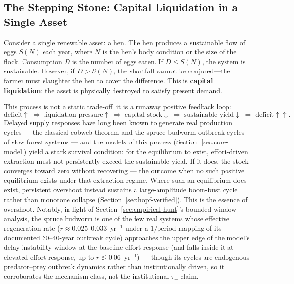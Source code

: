 \documentclass[twocolumn,10pt]{article}
\begin{document}
\subsection{The Stepping Stone: Capital Liquidation in a Single Asset}
Consider a single renewable asset: a hen. The hen produces a sustainable flow of eggs \(S(N)\) each year, where \(N\) is the hen's body condition or the size of the flock. Consumption \(D\) is the number of eggs eaten. If \(D \leq S(N)\), the system is sustainable. However, if \(D > S(N)\), the shortfall cannot be conjured---the farmer must slaughter the hen to cover the difference. This is \textbf{capital liquidation}: the asset is physically destroyed to satisfy present demand.

This process is not a static trade-off; it is a runaway positive feedback loop:
\[
\text{deficit} \uparrow \;\Rightarrow\; \text{liquidation pressure} \uparrow \;\Rightarrow\; \text{capital stock} \downarrow \;\Rightarrow\; \text{sustainable yield} \downarrow \;\Rightarrow\; \text{deficit} \uparrow\uparrow .
\]
Delayed supply responses have long been known to generate real production cycles --- the classical cobweb theorem \cite{ezekiel1938} and the spruce-budworm outbreak cycles of slow forest systems \cite{ludwig1978} --- and the models of this process (Section~\ref{sec:core-model}) yield a stark survival condition: for the equilibrium to exist, effort-driven extraction must not persistently exceed the sustainable yield. If it does, the stock converges toward zero without recovering --- the outcome when no such positive equilibrium exists under that extraction regime. Where such an equilibrium does exist, persistent overshoot instead sustains a large-amplitude boom-bust cycle rather than monotone collapse (Section~\ref{sec:hopf-verified}). This is the essence of overshoot. Notably, in light of Section~\ref{sec:empirical-hunt}'s bounded-window analysis, the spruce budworm is one of the few real systems whose effective regeneration rate ($r\approx0.025$--$0.033$~yr$^{-1}$ under a $1/\text{period}$ mapping of its documented $30$--$40$-year outbreak cycle) approaches the upper edge of the model's delay-instability window at the baseline effort response (and falls inside it at elevated effort response, up to $r\lesssim0.06$~yr$^{-1}$) --- though its cycles are endogenous predator--prey outbreak dynamics rather than institutionally driven, so it corroborates the mechanism class, not the institutional $\tau_-$ claim.
\end{document}
